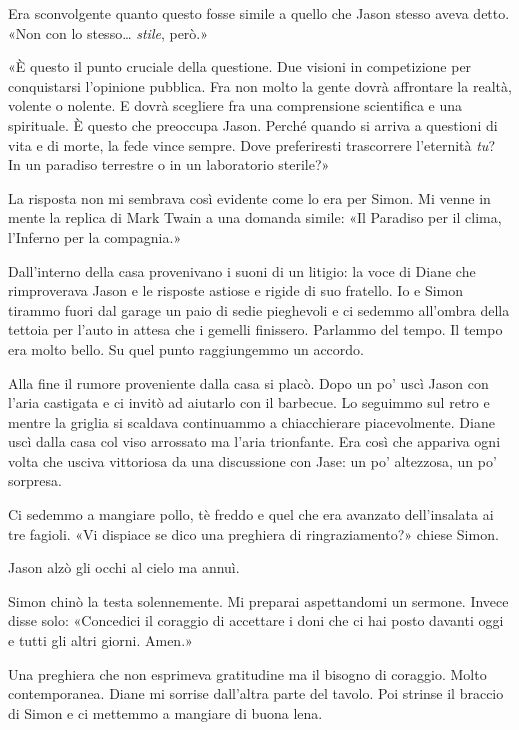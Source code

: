 Era sconvolgente quanto questo fosse simile a quello che Jason stesso
aveva detto. «Non con lo stesso\ldots{} \emph{stile}, però.»

«È questo il punto cruciale della questione. Due visioni in competizione
per conquistarsi l'opinione pubblica. Fra non molto la gente dovrà
affrontare la realtà, volente o nolente. E dovrà scegliere fra una
comprensione scientifica e una spirituale. È questo che preoccupa Jason.
Perché quando si arriva a questioni di vita e di morte, la fede vince
sempre. Dove preferiresti trascorrere l'eternità \emph{tu}? In un
paradiso terrestre o in un laboratorio sterile?»

La risposta non mi sembrava così evidente come lo era per Simon. Mi
venne in mente la replica di Mark Twain a una domanda simile: «Il
Paradiso per il clima, l'Inferno per la compagnia.»

\separatorefiori

Dall'interno della casa provenivano i suoni di un litigio: la voce di
Diane che rimproverava Jason e le risposte astiose e rigide di suo
fratello. Io e Simon tirammo fuori dal garage un paio di sedie
pieghevoli e ci sedemmo all'ombra della tettoia per l'auto in attesa che
i gemelli finissero. Parlammo del tempo. Il tempo era molto bello. Su
quel punto raggiungemmo un accordo.

Alla fine il rumore proveniente dalla casa si placò. Dopo un po' uscì
Jason con l'aria castigata e ci invitò ad aiutarlo con il barbecue. Lo
seguimmo sul retro e mentre la griglia si scaldava continuammo a
chiacchierare piacevolmente. Diane uscì dalla casa col viso arrossato ma
l'aria trionfante. Era così che appariva ogni volta che usciva
vittoriosa da una discussione con Jase: un po' altezzosa, un po'
sorpresa.

Ci sedemmo a mangiare pollo, tè freddo e quel che era avanzato
dell'insalata ai tre fagioli. «Vi dispiace se dico una preghiera di
ringraziamento?» chiese Simon.

Jason alzò gli occhi al cielo ma annuì.

Simon chinò la testa solennemente. Mi preparai aspettandomi un sermone.
Invece disse solo: «Concedici il coraggio di accettare i doni che ci hai
posto davanti oggi e tutti gli altri giorni. Amen.»

Una preghiera che non esprimeva gratitudine ma il bisogno di coraggio.
Molto contemporanea. Diane mi sorrise dall'altra parte del tavolo. Poi
strinse il braccio di Simon e ci mettemmo a mangiare di buona lena.

